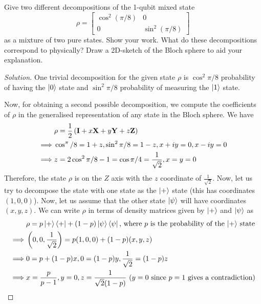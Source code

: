 \begin{solution}[label=ques:3]
  \begin{question}
    Give two different decompositions of the 1-qubit mixed state $$\rho = \begin{bmatrix}\cos^2(\pi/8) & 0\\ 0 & \sin^2(\pi/8)\end{bmatrix}$$ as a mixture of two pure states. Show your work. What do these decompositions correspond to physically?
Draw a 2D-sketch of the Bloch sphere to aid your explanation.
  \end{question}
  \tcblower{}
  \begin{proof}[Solution]
    One trivial decomposition for the given state $\rho$ is $\cos^2\pi/8$ probability of having the $\ket{0}$ state and $\sin^2\pi/8$ probability of measuring the $\ket{1}$ state.\par
    Now, for obtaining a second possible decomposition, we compute the coefficients of $\rho$ in the generalised representation of any state in the Bloch sphere. We have
    \begin{equation}
      \begin{split}
        &\rho = \frac{1}{2}\left(\mathbf{I} + x\mathbf{X} + y\mathbf{Y} + z\mathbf{Z}\right)\\
        \implies &\cos^\pi/8 = 1 + z, \sin^2\pi/8 = 1 - z, x + iy = 0, x - iy = 0\\
        \implies &z = 2\cos^2\pi/8 - 1 = \cos\pi/4 = \frac{1}{\sqrt{2}}, x = y = 0
      \end{split}
      \label{eq:blochdecomp}
    \end{equation}
    Therefore, the state $\rho$ is on the $Z$ axis with the $z$ coordinate of $\frac{1}{\sqrt{2}}$. Now, let us try to decompose the state with one state as the $\ket{+}$ state (this has coordinates $(1, 0, 0)$). Now, let us assume that the other state $\ket{\psi}$ will have coordinates $(x, y, z)$. We can write $\rho$ in terms of density matrices given by $\ket{+}$ and $\ket{\psi}$ as
    \begin{equation}
      \begin{split}
        &\rho = p\ketbra{+} + (1 - p)\ketbra{\psi}\text{, where $p$ is the probability of the $\ket{+}$ state}\\
        \implies &\left(0, 0, \frac{1}{\sqrt{2}}\right) = p(1, 0, 0) + (1 - p)(x, y, z)\\
        \implies &0 = p + (1 - p)x, 0 = (1 - p)y, \frac{1}{\sqrt{2}} = (1 - p)z\\
        \implies &x = \frac{p}{p - 1}, y = 0, z = \frac{1}{\sqrt{2}(1 - p)}\text{ ($y = 0$ since $p = 1$ gives a contradiction)}

\end{split}
\end{equation}
\end{proof}
\end{solution}
